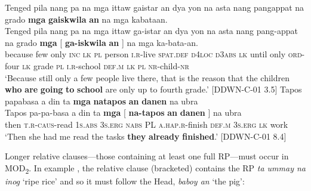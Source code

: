 \ea
\label{bkm:Ref447714036}
Tenged  pila  nang  pa  na  mga  ittaw  gaistar  an  dya  yon  na  asta  nang  pangappat na  grado  \textbf{mga}  \textbf{gaiskwila}  \textbf{an}   na  mga  kabataan. \\\smallskip
 \gll Tenged  pila  nang  pa  na  mga  ittaw  ga-istar  an  dya  yon  na  asta  nang  pang-appat  na  grado  \textbf{mga}  [ \textbf{ga-iskwila}  \textbf{an}   ]  na  mga  ka-bata-an. \\
because  few  only  \textsc{inc}  \textsc{lk}  \textsc{pl}  person  \textsc{i.r}-live  \textsc{spat.def}  \textsc{d}4\textsc{loc}  \textsc{d3abs}  \textsc{lk} until  only  \textsc{ord}-four  \textsc{lk}  grade  \textsc{pl}  {}  \textsc{i.r-}school  \textsc{def.m} {} \textsc{lk}  \textsc{pl}  \textsc{nr}-child-\textsc{nr} \\
\glt `Because still only a few people live there, that is the reason that the children \textbf{who} \textbf{are} \textbf{going} \textbf{to} \textbf{school} are only up to fourth grade.’ [DDWN-C-01 3.5]
\z
\ea
\label{bkm:Ref421109060}
Tapos  papabasa  a  din  ta  \textbf{mga}  \textbf{natapos}  \textbf{an}  \textbf{danen} na  ubra \\\smallskip
 \gll Tapos  pa-pa-basa  a  din  ta  \textbf{mga}  [ \textbf{na-tapos}  \textbf{an}  \textbf{danen} ] na  ubra \\
then  \textsc{t.r-caus}-read  1\textsc{s.abs}  \textsc{3}\textsc{s.erg}  \textsc{nabs}  \textsc{PL} {} \textsc{a.hap.r}\textsc{-}finish  \textsc{def.m}  3\textsc{s.erg}
{} \textsc{lk}  work \\
\glt `Then she had me read the tasks \textbf{they} \textbf{already} \textbf{finished}.’ [DDWN-C-01 8.4]
\z

Longer relative clauses---those containing at least one full RP---must occur in MOD\textsubscript{2}. In example , the relative clause (bracketed) contains the RP \textit{ta ummay na inog} ‘ripe rice’ and so it must follow the Head, \textit{baboy an} ‘the pig’:


